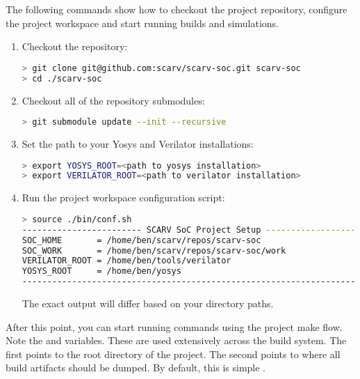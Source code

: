 
The following commands show how to checkout the \SCARVSOC project
repository, configure the project workspace and start running
builds and simulations.

\begin{enumerate}

\item Checkout the repository:

\begin{lstlisting}[language=bash,style=block]
> git clone git@github.com:scarv/scarv-soc.git scarv-soc
> cd ./scarv-soc
\end{lstlisting}

\item Checkout all of the repository submodules:

\begin{lstlisting}[language=bash,style=block]
> git submodule update --init --recursive
\end{lstlisting}

\item Set the path to your Yosys and Verilator installations:

\begin{lstlisting}[language=bash,style=block]
> export YOSYS_ROOT=<path to yosys installation>
> export VERILATOR_ROOT=<path to verilator installation>
\end{lstlisting}

\item Run the project workspace configuration script:

\begin{lstlisting}[language=bash,style=block]
> source ./bin/conf.sh
------------------------ SCARV SoC Project Setup ----------------------
SOC_HOME       = /home/ben/scarv/repos/scarv-soc
SOC_WORK       = /home/ben/scarv/repos/scarv-soc/work
VERILATOR_ROOT = /home/ben/tools/verilator
YOSYS_ROOT     = /home/ben/yosys
-----------------------------------------------------------------------
\end{lstlisting}

The exact output will differ based on your directory paths.

\end{enumerate}

After this point, you can start running commands using the project
make flow.
Note the \SOCHOME and \SOCWORK variables.
These are used extensively across the build system.
The first points to the root directory of the project.
The second points to where all build artifacts should be dumped.
By default, this is simple .

